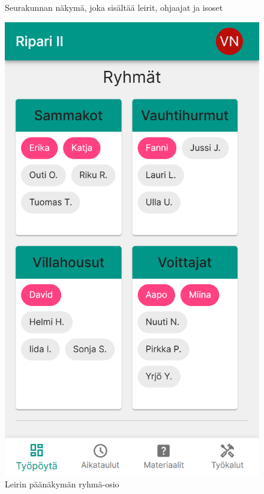 \begin{figure}[h!]
\begin{minipage}[b]{.3\textwidth}
        \caption{Seurakunnan näkymä, joka sisältää leirit, ohjaajat ja isoset}
        \label{fig:isosapp-leirit}
    \end{minipage}\qquad
    \begin{minipage}[b]{.3\textwidth}
        \includegraphics[width=\textwidth]{figures/isosapp-ryhmat.png}
        \caption{Leirin päänäkymän ryhmä-osio}
        \label{fig:isosapp-ryhmat}
    \end{minipage}
\end{figure}

